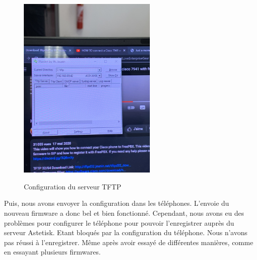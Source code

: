 \documentclass[12pt, a4paper]{article}
\begin{document}
	\begin{figure}[h]
		\centering
		{\includegraphics[width=0.6\textwidth]{img/85DFF5EE-EF97-4E83-9172-4FDA03718B73_1_105_c.jpeg}}
		\caption{Configuration du serveur TFTP}
		\label{fig:tftp}
	\end{figure}
	
	Puis, nous avons envoyer la configuration dans les téléphones. 
	L'envoie du nouveau firmware a donc bel et bien fonctionné. Cependant,
	nous avons eu des problèmes pour configurer le téléphone pour pouvoir
	l'enregistrer auprès du serveur Astetisk. Etant bloqués par la configuration
	du téléphone. Nous n'avons pas réussi à l'enregistrer. Même après avoir
	essayé de différentes manières, comme en essayant plusieurs firmwares.\\ 
\end{document}
